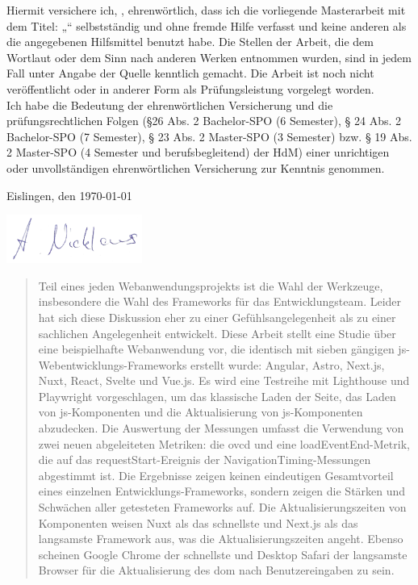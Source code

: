 \documentclass[a4paper, 12pt]{article}
\makeatletter
\let\Title\@title
\let\Author\@author
\makeatother
\begin{document}
	Hiermit versichere ich, \Author, ehrenwörtlich, dass ich die
	vorliegende Masterarbeit mit dem Titel: „\Title“ selbstständig und ohne fremde Hilfe verfasst und keine
	anderen als die angegebenen Hilfsmittel benutzt habe. Die Stellen der Arbeit, die dem
	Wortlaut oder dem Sinn nach anderen Werken entnommen wurden, sind in jedem Fall
	unter Angabe der Quelle kenntlich gemacht. Die Arbeit ist noch nicht veröffentlicht oder
	in anderer Form als Prüfungsleistung vorgelegt worden.\\
	
	Ich habe die Bedeutung der ehrenwörtlichen Versicherung und die prüfungsrechtlichen
	Folgen (§26 Abs. 2 Bachelor-SPO (6 Semester), § 24 Abs. 2 Bachelor-SPO (7 Semester), §
	23 Abs. 2 Master-SPO (3 Semester) bzw. § 19 Abs. 2 Master-SPO (4 Semester und
	berufsbegleitend) der HdM) einer unrichtigen oder unvollständigen ehrenwörtlichen
	Versicherung zur Kenntnis genommen.
	\vspace{30px}
	
	Eislingen, den \today
	\vspace{20px}
	
	\includegraphics[height=60px]{img/unterschrift.png}
	\vspace{10px}
	
	\Author

\pagebreak

\begin{abstract}
  Teil eines jeden Webanwendungsprojekts ist die Wahl der Werkzeuge, insbesondere die Wahl des Frameworks für das Entwicklungsteam.
  Leider hat sich diese Diskussion eher zu einer Gefühlsangelegenheit als zu einer sachlichen Angelegenheit entwickelt.
  Diese Arbeit stellt eine Studie über eine beispielhafte Webanwendung vor, die identisch mit sieben gängigen \acrlong{js}-Webentwicklungs-Frameworks erstellt wurde: Angular, Astro, Next.js, Nuxt, React, Svelte und Vue.js.
  Es wird eine Testreihe mit Lighthouse und Playwright vorgeschlagen, um das klassische Laden der Seite, das Laden von \acrlong{js}-Komponenten und die Aktualisierung von \acrlong{js}-Komponenten abzudecken.
  Die Auswertung der Messungen umfasst die Verwendung von zwei neuen abgeleiteten Metriken: die \acrfull{ovcd} und eine loadEventEnd-Metrik, die auf das requestStart-Ereignis der NavigationTiming-Messungen abgestimmt ist.
  Die Ergebnisse zeigen keinen eindeutigen Gesamtvorteil eines einzelnen Entwicklungs-Frameworks, sondern zeigen die Stärken und Schwächen aller getesteten Frameworks auf.
  Die Aktualisierungszeiten von Komponenten weisen Nuxt als das schnellste und Next.js als das langsamste Framework aus, was die Aktualisierungszeiten angeht.
  Ebenso scheinen Google Chrome der schnellste und Desktop Safari der langsamste Browser für die Aktualisierung des \acrshort{dom} nach Benutzereingaben zu sein.
\end{abstract}
\end{document}
